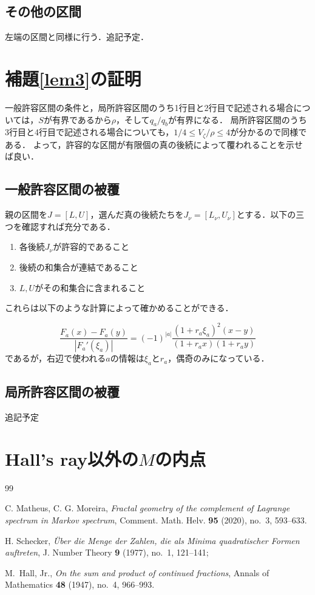 \documentclass[10pt,a4paper]{ujarticle}
\theoremstyle{definition}
\begin{document}
\subsection{その他の区間}
左端の区間と同様に行う．追記予定．

\section{補題\ref{lem3}の証明}
一般許容区間の条件と，局所許容区間のうち1行目と2行目で記述される場合については，$S$が有界であるから$\rho$，そして$q_a/ q_b$が有界になる．
局所許容区間のうち3行目と4行目で記述される場合についても，$1/4 \le V_\zeta / \rho \le 4$が分かるので同様である．
よって，許容的な区間が有限個の真の後続によって覆われることを示せば良い．

\subsection{一般許容区間の被覆}
親の区間を$J = [L, U]$，選んだ真の後続たちを$J_\nu = [L_\nu, U_\nu]$とする．以下の三つを確認すれば充分である．
\begin{enumerate}
    \item 各後続$J_\nu$が許容的であること
    \item 後続の和集合が連結であること
    \item $L, U$がその和集合に含まれること
\end{enumerate}

これらは以下のような計算によって確かめることができる．

\[
\frac{F_a(x) - F_a(y)}{|F_a'(\xi_a)|} = (-1)^{|a|}\frac{(1 + r_a\xi_a)^2(x-y)}{(1 + r_ax)(1 + r_ay)}
\]
であるが，右辺で使われる$a$の情報は$\xi_a$と$r_a$，偶奇のみになっている．

\subsection{局所許容区間の被覆}
追記予定

\section{Hall's ray以外の$M$の内点}


\begin{thebibliography}{99}
    \raggedright
    C. Matheus, C. G. Moreira,
    {\it Fractal geometry of the complement of Lagrange spectrum in Markov spectrum},
    Comment. Math. Helv. {\bf 95} (2020), no.~3, 593--633.

    H. Schecker, 
    {\it \"Uber die Menge der Zahlen, die als Minima quadratischer Formen auftreten}, 
    J. Number Theory {\bf 9} (1977), no.~1, 121--141;
    
    M.~Hall, Jr.,
    \textit{On the sum and product of continued fractions},
    Annals of Mathematics \textbf{48} (1947), no.~4, 966--993.
    \end{thebibliography}
    
    
\end{document}
